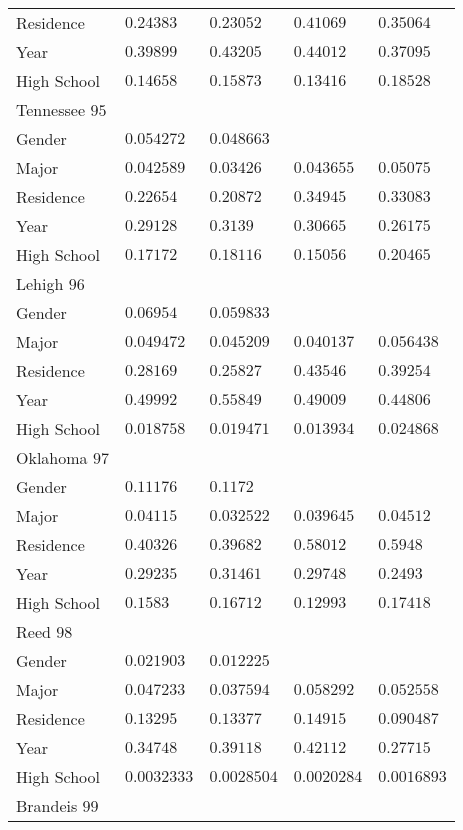 \begin{center}
\begin{longtable}{|l|l|l|l|l|}
Residence & $0.24383$ & $0.23052$ & $0.41069$ & $0.35064$ \\
Year & $0.39899$ & $0.43205$ & $0.44012$ & $0.37095$ \\
High School & $0.14658$ & $0.15873$ & $0.13416$ & $0.18528$ \\ \hline \hline
Tennessee $95$ & & &   \\ \hline
Gender & $0.054272$ & $0.048663$ & & \\
Major & $0.042589$ & $0.03426$ & $0.043655$ & $0.05075$ \\
Residence & $0.22654$ & $0.20872$ & $0.34945$ & $0.33083$ \\
Year & $0.29128$ & $0.3139$ & $0.30665$ & $0.26175$ \\
High School & $0.17172$ & $0.18116$ & $0.15056$ & $0.20465$ \\ \hline \hline
Lehigh $96$ & & &   \\ \hline
Gender & $0.06954$ & $0.059833$ & & \\
Major & $0.049472$ & $0.045209$ & $0.040137$ & $0.056438$ \\
Residence & $0.28169$ & $0.25827$ & $0.43546$ & $0.39254$ \\
Year & $0.49992$ & $0.55849$ & $0.49009$ & $0.44806$ \\
High School & $0.018758$ & $0.019471$ & $0.013934$ & $0.024868$ \\ \hline \hline
Oklahoma $97$ & & &   \\ \hline
Gender & $0.11176$ & $0.1172$ & & \\
Major & $0.04115$ & $0.032522$ & $0.039645$ & $0.04512$ \\
Residence & $0.40326$ & $0.39682$ & $0.58012$ & $0.5948$ \\
Year & $0.29235$ & $0.31461$ & $0.29748$ & $0.2493$ \\
High School & $0.1583$ & $0.16712$ & $0.12993$ & $0.17418$ \\ \hline \hline
Reed $98$ & & &   \\ \hline
Gender & $0.021903$ & $0.012225$ & & \\
Major & $0.047233$ & $0.037594$ & $0.058292$ & $0.052558$ \\
Residence & $0.13295$ & $0.13377$ & $0.14915$ & $0.090487$ \\
Year & $0.34748$ & $0.39118$ & $0.42112$ & $0.27715$ \\
High School & $0.0032333$ & $0.0028504$ & $0.0020284$ & $0.0016893$ \\ \hline \hline
Brandeis $99$ & & &   \\ \hline

\end{longtable}
\end{center}

